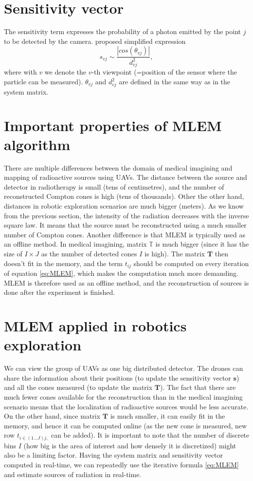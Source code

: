 \section{Sensitivity vector}
The sensitivity term expresses the probability of a photon emitted by the point $j$ to be detected by the camera. 
\cite{maxim2016} proposed simplified expression
\begin{equation}
  s_{vj} \sim \frac{\left| cos(\theta_{vj}) \right|}{d^{2}_{vj}},
\end{equation}
where with $v$ we denote the $v$-th viewpoint (=position of the sensor where the particle can be measured). $\theta_{vj}$ and $d^{2}_{vj}$ are defined in the same way as in the system matrix.

\section{Important properties of MLEM algorithm}
There are multiple differences between the domain of medical imagining and mapping of radioactive sources using \ac{UAV}s.
The distance between the source and detector in radiotherapy is small (tens of centimetres), and the number of reconstructed Compton cones is high (tens of thousands).
Other the other hand, distances in robotic exploration scenarios are much bigger (meters). 
As we know from the previous section, the intensity of the radiation decreases with the inverse square law.
It means that the source must be reconstructed using a much smaller number of Compton cones.
Another difference is that \ac{MLEM} is typically used as an offline method.
In medical imagining, matrix $\mathbb{T}$ is much bigger (since it has the size of $I \times J$ as the number of detected cones $I$ is high).
The matrix $\mathbf{T}$ then doesn't fit in the memory, and the term $t_{ij}$ should be computed on every iteration of equation \ref{eq:MLEM}, which makes the computation much more demanding.
\ac{MLEM} is therefore used as an offline method, and the reconstruction of sources is done after the experiment is finished.

\section{MLEM applied in robotics exploration}
We can view the group of \ac{UAV}s as one big distributed detector.
The drones can share the information about their positions (to update the sensitivity vector $\mathbf{s}$) and all the cones measured (to update the matrix $\mathbf{T}$).
The fact that there are much fewer cones available for the reconstruction than in the medical imagining scenario means that the localization of radioactive sources would be less accurate. 
On the other hand, since matrix $\mathbf{T}$ is much smaller, it can easily fit in the memory, and hence it can be computed online (as the new cone is measured, new row $t_{i\in(1 \dotsc J) j,}$ can be added). 
It is important to note that the number of discrete bins $I$ (how big is the area of interest and how densely it is discretized) might also be a limiting factor.
Having the system matrix and sensitivity vector computed in real-time, we can repeatedly use the iterative formula \ref{eq:MLEM} and estimate sources of radiation in real-time.

